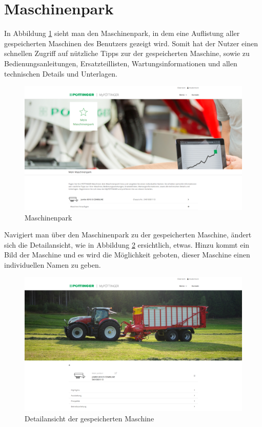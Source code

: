 \section{Maschinenpark}

In Abbildung \ref{fig:maschinenpark} sieht man den Maschinenpark, in dem eine Auflistung aller gespeicherten Maschinen des Benutzers gezeigt wird. Somit hat der Nutzer einen schnellen Zugriff auf nützliche Tipps zur der gespeicherten Maschine, sowie zu Bedienungsanleitungen, Ersatzteillisten, Wartungsinformationen und allen technischen Details und Unterlagen.

\begin{figure}[H]
	\centerline{
		\includegraphics[width=1\textwidth, frame]{./grafiken/erm_maschinenpark.png}
	}
	\vskip0pt
	\caption{Maschinenpark} \label{fig:maschinenpark}
\end{figure}

Navigiert man über den Maschinenpark zu der gespeicherten Maschine, ändert sich die Detailansicht, wie in Abbildung \ref{fig:savedMaschine} ersichtlich, etwas. Hinzu kommt ein Bild der Maschine und es wird die Möglichkeit geboten, dieser Maschine einen individuellen Namen zu geben.

\begin{figure}[H]
	\centerline{
		\includegraphics[width=1\textwidth, frame]{./grafiken/erm_detailansicht_saved_machine.png}
	}
	\vskip0pt
	\caption{Detailansicht der gespeicherten Maschine} \label{fig:savedMaschine}
\end{figure}

